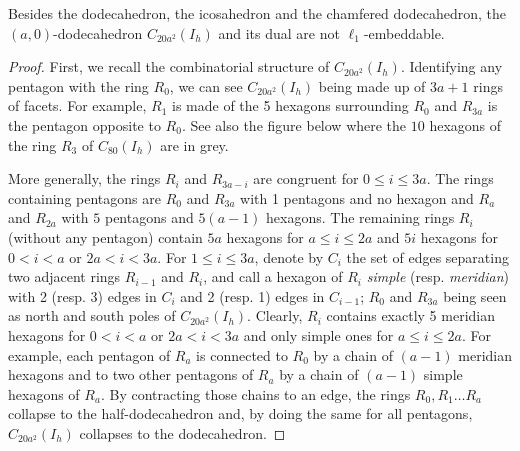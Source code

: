 \begin{proposition}\label{champ} 
Besides the dodecahedron, the icosahedron and the chamfered dodecahedron,
the $(a,0)$-dodecahedron $C_{20a^2}(I_h)$ and its dual are not $\ell_1$-embeddable. 
\begin{proof}
First, we recall the combinatorial structure of $C_{20a^2}(I_h)$.
Identifying any  pentagon with the ring $R_0$, we can see $C_{20a^2}(I_h)$
being made up of $3a+1$ rings of facets. For example, $R_1$ is made of the 5
hexagons surrounding $R_0$ and $R_{3a}$ is the pentagon opposite to $R_0$.
See also the
figure below where the $10$ hexagons of the ring $R_3$ of $C_{80}(I_h)$ are in grey.

\begin{center}
\end{center}

More generally, the rings $R_i$ and $R_{3a-i}$ are congruent for $0\leq i\leq 3a$.
The rings containing pentagons are $R_0$ and $R_{3a}$ with 1 pentagons and no hexagon
and $R_{a}$ and $R_{2a}$ with $5$ pentagons and $5(a-1)$ hexagons. The remaining
rings $R_i$ (without any pentagon) contain $5a$ hexagons for $a\leq i \leq 2a$
and $5i$ hexagons for $0<i<a$ or $2a<i<3a$. For $1\leq i\leq 3a$,
denote by $C_i$ the set of edges separating two adjacent rings $R_{i-1}$ and $R_i$,
and call a hexagon of $R_i$ {\em simple} (resp. {\em meridian}) with 2 (resp. 3)
edges in $C_i$ and 2 (resp. 1) edges in $C_{i-1}$; $R_0$ and $R_{3a}$ being seen
as north and south poles of $C_{20a^2}(I_h)$. Clearly,
$R_i$ contains exactly 5 meridian hexagons
for $0<i<a$ or $2a<i<3a$ and only simple ones for $a\leq i \leq 2a$. For example,
each pentagon
of $R_a$ is connected to $R_0$ by a chain of $(a-1)$ meridian hexagons
and to two other pentagons of $R_a$ by a chain of $(a-1)$ simple hexagons of $R_a$.
By contracting those chains to an edge, the rings $R_0,R_1\dots R_a$ collapse to
the half-dodecahedron and, by doing the same for all pentagons, $C_{20a^2}(I_h)$
collapses to the dodecahedron.



\end{proof}
\end{proposition}
